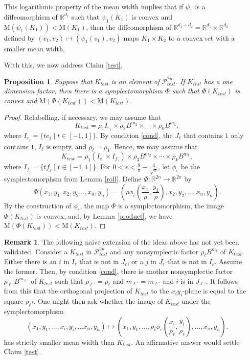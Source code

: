 \documentclass[12pt]{amsart}
\newtheorem{proposition}[theorem]{Proposition}
\theoremstyle{definition}
\newtheorem{remark}[theorem]{Remark}
\newcommand{\RR}{{\mathbb R}}
\newcommand{\mw}{{{\mathrm {M}}}}
\begin{document}
This logarithmic property of the mean width implies that if $\psi_1$ is a diffeomorphism of $\RR^{d_1}$ such that $\psi_1(K_1)$ is convex and $\mw(\psi_1(K_1))< \mw(K_1)$, then the diffeomorphism of $\RR^{d_1 + d_2}= \RR^{d_1} \times \RR^{d_2}$ defined by $(v_1, v_2) \mapsto (\psi_1(v_1), v_2)$ maps $K_1 \times K_2$ to a convex set with a smaller mean width.


With this, we now address Claim \ref{test}.

\begin{proposition}
Suppose that  $K_{test}$ is an element of $\mathcal{P}^{2n}_{test}$. If $K_{test}$ has a one dimension factor, then there is a symplectomorphism $\Phi$ such that $\Phi(K_{test})$ is convex and $\mw(\Phi(K_{test})) < \mw(K_{test})$.
\end{proposition}
  
\begin{proof}
Relabelling, if necessary, we may assume that $$K_{test} = \rho_1 I_{e_1} \times \rho_2 B^{m_2} \times \cdots \times \rho_k B^{m_k},$$ where $I_{e_j} = \{te_j \mid t \in [-1,1]\}$. By condition \eqref{cond}, the $J_{\ell}$ that contains $1$ only contains $1$, $I_{\ell}$ is empty, and $\rho_{\ell} = \rho_1$. Hence, we may assume that
$$K_{test} = \rho_1( I_{e_1} \times  I_{f_1}) \times \rho_3 B^{m_2} \times \cdots \times \rho_k B^{m_k},$$ where $I_{f_j}= \{tf_j \mid t \in [-1,1]\}$. For $0< \epsilon < \frac{8}{\pi} - \frac{4}{\sqrt{\pi}}$, let $\phi_{\epsilon}$ be the symplectomorphsm from Lemma \ref{roll}. Define $\Phi \colon \RR^{2n} \to \RR^{2n}$ by
$$\Phi(x_1,y_1, x_2, y_2 \dots, x_n, y_n) = \left(\rho \phi_{\epsilon}\left(\frac{x_1}{\rho}, \frac{y_1}{\rho}\right), x_2, y_2, \dots, x_n,y_n\right).$$
By the construction of $\phi_{\epsilon}$, the map $\Phi$ is a symplectomorphism, the image $\Phi(K_{test})$ is convex, and, by Lemma \ref{product}, we have  $\mw(\Phi(K_{test}))< \mw(K_{test}).$
\end{proof}

\begin{remark} The following naive extension of the ideas above has not yet been validated. Consider a $K_{test}$ in $\mathcal{P}^{2n}_{test}$ and any nonsymplectic factor $\rho_{\ell} B^{m_{\ell}}$ of $K_{test}$. Either there is an  $i$ in $I_{\ell}$ that is not in $J_{\ell}$, or a $j$ in $J_{\ell}$ that is not in $I_{\ell}$. Assume the former.
Then, by condition \eqref{cond}, there is another nonsymplectic factor $\rho_{\ell'} B^{m_{\ell'}}$ of $K_{test}$ such that  $\rho_{\ell'} = \rho_{\ell}$ and $m_{\ell'} = m_{\ell'}$ and $i$ is in $J_{\ell'}$. It follows from this that the orthogonal projection of $K_{test}$ to the $x_{i}y_{i}$-plane is equal to the square $\rho_{\ell} \square.$ One might then ask whether the image of $K_{test}$ under the symplectomorphism 
$$(x_1,y_1,\dots,x_i, y_i, \dots x_n, y_n) \mapsto \left(x_1, y_1, \dots, \rho_\ell \phi_{\epsilon}\left(\frac{x_i}{\rho_\ell}, \frac{y_i}{\rho_\ell}\right), \dots, x_n,y_n\right).$$
has strictly smaller mean width than $K_{test}$. An affirmative answer would settle Claim \ref{test}.
\end{remark}
\end{document}
